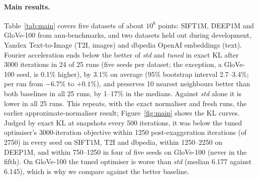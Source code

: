 \documentclass[11pt]{article}
\begin{document}
\paragraph{Main results.} Table~\ref{tab:main} covers five datasets of about $10^6$ points: SIFT1M, DEEP1M and
GloVe-100 from ann-benchmarks, and two datasets held out during development, Yandex Text-to-Image (T2I,
images) and dbpedia OpenAI embeddings (text). Fourier acceleration ends below the better of \emph{std} and
\emph{tuned} in exact KL after 3000 iterations in 24 of 25 runs (five seeds per dataset; the exception, a GloVe-100
seed, is 0.1\% higher), by 3.1\% on average (95\% bootstrap interval 2.7--3.4\%; per run from $-6.7\%$ to $+0.1\%$), and
preserves 10 nearest neighbours better than both baselines in all 25 runs, by 1--17\% in the medians. Against
\emph{std} alone it is lower in all 25 runs. This repeats, with the exact normaliser and fresh runs, the earlier
approximate-normaliser result; Figure~\ref{fig:main} shows the KL curves. Judged by exact KL at snapshots every 500
iterations, it was below the tuned
optimiser's 3000-iteration objective within 1250 post-exaggeration iterations (of 2750) in every seed on SIFT1M,
T2I and dbpedia, within 1250--2250 on DEEP1M, and within 750--1250 in four of five seeds on GloVe-100 (never in the
fifth). On GloVe-100 the tuned optimiser is worse than \emph{std} (median 6.177 against 6.145), which is why we compare
against the better baseline.
\end{document}
